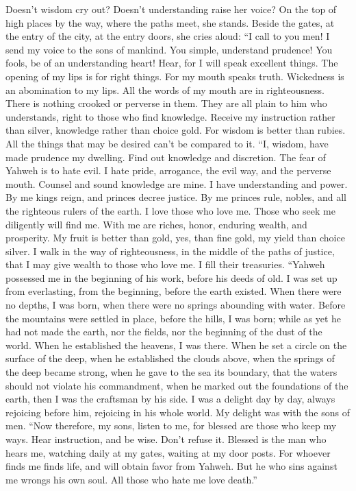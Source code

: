  Doesn't wisdom cry out? Doesn't understanding raise her
voice?  On the top of high places by the way, where the
paths meet, she stands.  Beside the gates, at the entry of
the city, at the entry doors, she cries aloud:  ``I call to
you men! I send my voice to the sons of mankind.  You
simple, understand prudence! You fools, be of an understanding heart!
 Hear, for I will speak excellent things. The opening of my
lips is for right things.  For my mouth speaks truth.
Wickedness is an abomination to my lips.  All the words of
my mouth are in righteousness. There is nothing crooked or perverse in
them.  They are all plain to him who understands, right to
those who find knowledge.  Receive my instruction rather
than silver, knowledge rather than choice gold.  For wisdom
is better than rubies. All the things that may be desired can't be
compared to it.  ``I, wisdom, have made prudence my
dwelling. Find out knowledge and discretion.  The fear of
Yahweh is to hate evil. I hate pride, arrogance, the evil way, and the
perverse mouth.  Counsel and sound knowledge are mine. I
have understanding and power.  By me kings reign, and
princes decree justice.  By me princes rule, nobles, and
all the righteous rulers of the earth.  I love those who
love me. Those who seek me diligently will find me.  With
me are riches, honor, enduring wealth, and prosperity.  My
fruit is better than gold, yes, than fine gold, my yield than choice
silver.  I walk in the way of righteousness, in the middle
of the paths of justice,  that I may give wealth to those
who love me. I fill their treasuries.  ``Yahweh possessed
me in the beginning of his work, before his deeds of old. 
I was set up from everlasting, from the beginning, before the earth
existed.  When there were no depths, I was born, when there
were no springs abounding with water.  Before the mountains
were settled in place, before the hills, I was born;  while
as yet he had not made the earth, nor the fields, nor the beginning of
the dust of the world.  When he established the heavens, I
was there. When he set a circle on the surface of the deep,
 when he established the clouds above, when the springs of
the deep became strong,  when he gave to the sea its
boundary, that the waters should not violate his commandment, when he
marked out the foundations of the earth,  then I was the
craftsman by his side. I was a delight day by day, always rejoicing
before him,  rejoicing in his whole world. My delight was
with the sons of men.  ``Now therefore, my sons, listen to
me, for blessed are those who keep my ways.  Hear
instruction, and be wise. Don't refuse it.  Blessed is the
man who hears me, watching daily at my gates, waiting at my door posts.
 For whoever finds me finds life, and will obtain favor
from Yahweh.  But he who sins against me wrongs his own
soul. All those who hate me love death.''


